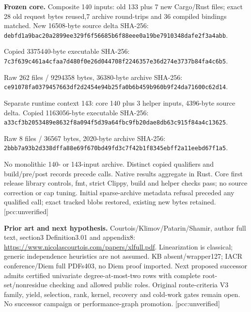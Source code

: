 \documentclass[10pt]{article}
\begin{document}
\textbf{Frozen core.} Composite 140 inputs: old 133 plus 7 new Cargo/Rust files; exact 28 old
request bytes reused,7 archive round-trips and 36 compiled bindings matched.
New 16508-byte source delta SHA-256:\\
\texttt{debfd1a9bac20a2899ee329f6f56685b6f88eee0a19be7910348dafe2f3a4abb}.\par
Copied 3375440-byte executable SHA-256:\\
\texttt{7c3f639c461a4cfaa7d480f0e26d044708f2246357e36d274e3737b84fa4c6b5}.\par
Raw 262 files / 9294358 bytes, 36380-byte archive SHA-256:\\
\texttt{ce91078fa0379457663df2d2454e94b25fa0b6b459b960b9f24da71600c62d14}.\par
Separate runtime context 143: core 140 plus 3 helper inputs, 4396-byte source delta.
Copied 1163056-byte executable SHA-256:\\
\texttt{a33cf3b2053489e8632f8a094f5d39a64fbc9fb20dae8db63c915f84a4c13625}.\par
Raw 8 files / 36567 bytes, 2020-byte archive SHA-256:\\
\texttt{2bbb7a93b2d338dffa88e69f670bd49fd3c7f42b1f8345ebff2a11eebd67f1a5}.\par
No monolithic 140- or 143-input archive. Distinct copied qualifiers and build/pre/post
records precede calls. Native results aggregate in Rust. Core first release
library controls, fmt, strict Clippy, build and helper checks pass; no source correction
or cap tuning. Initial sparse-archive metadata refusal preceded any qualified
call; exact tracked blobs restored, existing new bytes retained. [pcc:unverified]

\textbf{Prior art and next hypothesis.} Courtois/Klimov/Patarin/Shamir,
author full text, section3 Definition3.01 and appendix8:
\url{https://www.nicolascourtois.com/papers/xlfull.pdf}.
Linearization is classical; generic independence heuristics are not assumed.
KB absent/wrapper127; IACR conference/Diem full PDFs403, no Diem proof imported.
Next proposed successor admits certified univariate degree-at-most-two rows
with complete root-set/nonresidue checking and allowed public roles. Original
route-criteria V3 family, yield, selection, rank, kernel, recovery and cold-work gates
remain open. No successor campaign or performance-graph promotion.
[pcc:unverified]
\end{document}
